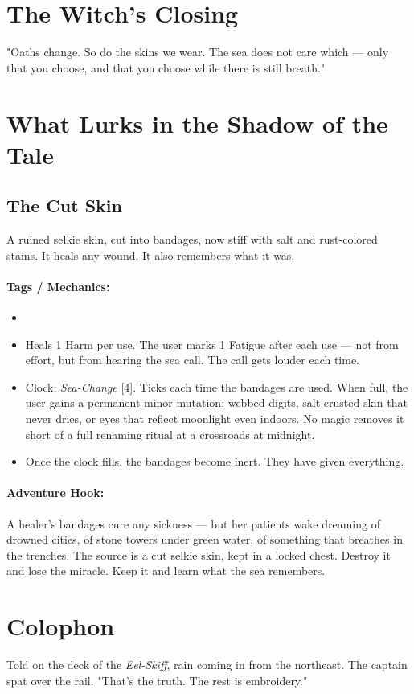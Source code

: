 \section*{The Witch's Closing}
"Oaths change. So do the skins we wear. The sea does not care which — only that you choose, and that you choose while there is still breath."

\section*{What Lurks in the Shadow of the Tale}

\subsection*{The Cut Skin}

A ruined selkie skin, cut into bandages, now stiff with salt and rust-colored stains. It heals any wound. It also remembers what it was.

\paragraph{Tags / Mechanics:}
\begin{itemize}
\item [HEAL] [CURSE] [TRANSFORM]
\item Heals 1 Harm per use. The user marks 1 Fatigue after each use — not from effort, but from hearing the sea call. The call gets louder each time.
\item Clock: \textit{Sea-Change} [4]. Ticks each time the bandages are used. When full, the user gains a permanent minor mutation: webbed digits, salt-crusted skin that never dries, or eyes that reflect moonlight even indoors. No magic removes it short of a full renaming ritual at a crossroads at midnight.
\item Once the clock fills, the bandages become inert. They have given everything.
\end{itemize}

\paragraph{Adventure Hook:}
A healer's bandages cure any sickness — but her patients wake dreaming of drowned cities, of stone towers under green water, of something that breathes in the trenches. The source is a cut selkie skin, kept in a locked chest. Destroy it and lose the miracle. Keep it and learn what the sea remembers.

\section*{Colophon}
Told on the deck of the \textit{Eel-Skiff}, rain coming in from the northeast. The captain spat over the rail. "That's the truth. The rest is embroidery."